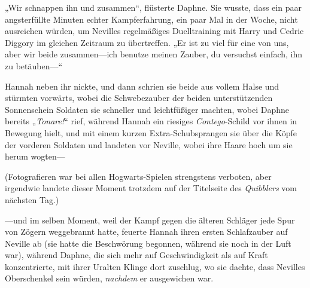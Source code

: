\later

„Wir schnappen ihn und zusammen“, flüsterte Daphne. Sie wusste, dass ein paar angsterfüllte Minuten echter Kampferfahrung, ein paar Mal in der Woche, nicht ausreichen würden, um Nevilles regelmäßiges Duelltraining mit Harry und Cedric Diggory im gleichen Zeitraum zu übertreffen. „Er ist zu viel für eine von uns, aber wir beide zusammen—ich benutze meinen Zauber, du versuchst einfach, ihn zu betäuben—“

Hannah neben ihr nickte, und dann schrien sie beide aus vollem Halse und stürmten vorwärts, wobei die Schwebezauber der beiden unterstützenden Sonnenschein Soldaten sie schneller und leichtfüßiger machten, wobei Daphne bereits „\emph{Tonare!}“ rief, während Hannah ein riesiges \emph{Contego}-Schild vor ihnen in Bewegung hielt, und mit einem kurzen Extra-Schubsprangen sie über die Köpfe der vorderen Soldaten und landeten vor Neville, wobei ihre Haare hoch um sie herum wogten—

(Fotografieren war bei allen Hogwarts-Spielen strengstens verboten, aber irgendwie landete dieser Moment trotzdem auf der Titelseite des \emph{Quibblers} vom nächsten Tag.)

—und im selben Moment, weil der Kampf gegen die älteren Schläger jede Spur von Zögern weggebrannt hatte, feuerte Hannah ihren ersten Schlafzauber auf Neville ab (sie hatte die Beschwörung begonnen, während sie noch in der Luft war), während Daphne, die sich mehr auf Geschwindigkeit als auf Kraft konzentrierte, mit ihrer Uralten Klinge dort zuschlug, wo sie dachte, dass Nevilles Oberschenkel sein würden, \emph{nachdem} er ausgewichen war.

